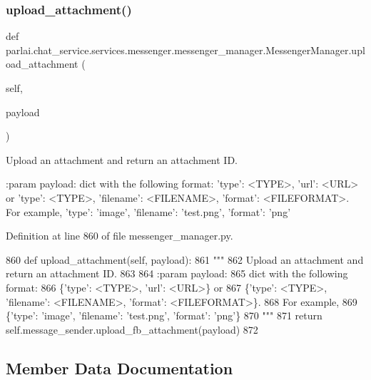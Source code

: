 \subsubsection{\texorpdfstring{upload\+\_\+attachment()}{upload\_attachment()}}
{\footnotesize\ttfamily def parlai.\+chat\+\_\+service.\+services.\+messenger.\+messenger\+\_\+manager.\+Messenger\+Manager.\+upload\+\_\+attachment (\begin{DoxyParamCaption}\item[{}]{self,  }\item[{}]{payload }\end{DoxyParamCaption})}

\begin{DoxyVerb}Upload an attachment and return an attachment ID.

:param payload:
    dict with the following format:
{'type': <TYPE>, 'url': <URL>} or
{'type': <TYPE>, 'filename': <FILENAME>, 'format': <FILEFORMAT>}.
For example,
{'type': 'image', 'filename': 'test.png', 'format': 'png'}
\end{DoxyVerb}
 

Definition at line 860 of file messenger\+\_\+manager.\+py.


\begin{DoxyCode}
860     \textcolor{keyword}{def }upload\_attachment(self, payload):
861         \textcolor{stringliteral}{"""}
862 \textcolor{stringliteral}{        Upload an attachment and return an attachment ID.}
863 \textcolor{stringliteral}{}
864 \textcolor{stringliteral}{        :param payload:}
865 \textcolor{stringliteral}{            dict with the following format:}
866 \textcolor{stringliteral}{                \{'type': <TYPE>, 'url': <URL>\} or}
867 \textcolor{stringliteral}{                \{'type': <TYPE>, 'filename': <FILENAME>, 'format': <FILEFORMAT>\}.}
868 \textcolor{stringliteral}{                For example,}
869 \textcolor{stringliteral}{                \{'type': 'image', 'filename': 'test.png', 'format': 'png'\}}
870 \textcolor{stringliteral}{        """}
871         \textcolor{keywordflow}{return} self.message\_sender.upload\_fb\_attachment(payload)
872 \end{DoxyCode}


\subsection{Member Data Documentation}
\mbox{\label{classparlai_1_1chat__service_1_1services_1_1messenger_1_1messenger__manager_1_1MessengerManager_a82126e4a66c02afffc55fd8126f1acc9}} 
